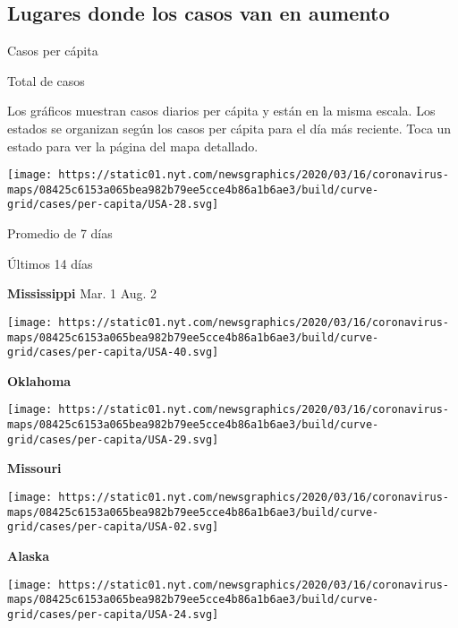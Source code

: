 \hypertarget{lugares-donde-los-casos-van-en-aumento}{%
\subsection{Lugares donde los casos van en
aumento}\label{lugares-donde-los-casos-van-en-aumento}}

Casos per cápita

Total de casos

Los gráficos muestran casos diarios per cápita y están en la misma
escala. Los estados se organizan según los casos per cápita para el día
más reciente. Toca un estado para ver la página del mapa detallado.

\href{https://www.nytimes.com/interactive/2020/us/mississippi-coronavirus-cases.html}{}

\texttt{[image: https://static01.nyt.com/newsgraphics/2020/03/16/coronavirus-maps/08425c6153a065bea982b79ee5cce4b86a1b6ae3/build/curve-grid/cases/per-capita/USA-28.svg]}

Promedio de 7 días

Últimos 14 días

\textbf{Mississippi} Mar. 1 Aug. 2

\href{https://www.nytimes.com/interactive/2020/us/oklahoma-coronavirus-cases.html}{}

\texttt{[image: https://static01.nyt.com/newsgraphics/2020/03/16/coronavirus-maps/08425c6153a065bea982b79ee5cce4b86a1b6ae3/build/curve-grid/cases/per-capita/USA-40.svg]}

\textbf{Oklahoma}

\href{https://www.nytimes.com/interactive/2020/us/missouri-coronavirus-cases.html}{}

\texttt{[image: https://static01.nyt.com/newsgraphics/2020/03/16/coronavirus-maps/08425c6153a065bea982b79ee5cce4b86a1b6ae3/build/curve-grid/cases/per-capita/USA-29.svg]}

\textbf{Missouri}

\href{https://www.nytimes.com/interactive/2020/us/alaska-coronavirus-cases.html}{}

\texttt{[image: https://static01.nyt.com/newsgraphics/2020/03/16/coronavirus-maps/08425c6153a065bea982b79ee5cce4b86a1b6ae3/build/curve-grid/cases/per-capita/USA-02.svg]}

\textbf{Alaska}

\href{https://www.nytimes.com/interactive/2020/us/maryland-coronavirus-cases.html}{}

\texttt{[image: https://static01.nyt.com/newsgraphics/2020/03/16/coronavirus-maps/08425c6153a065bea982b79ee5cce4b86a1b6ae3/build/curve-grid/cases/per-capita/USA-24.svg]}

